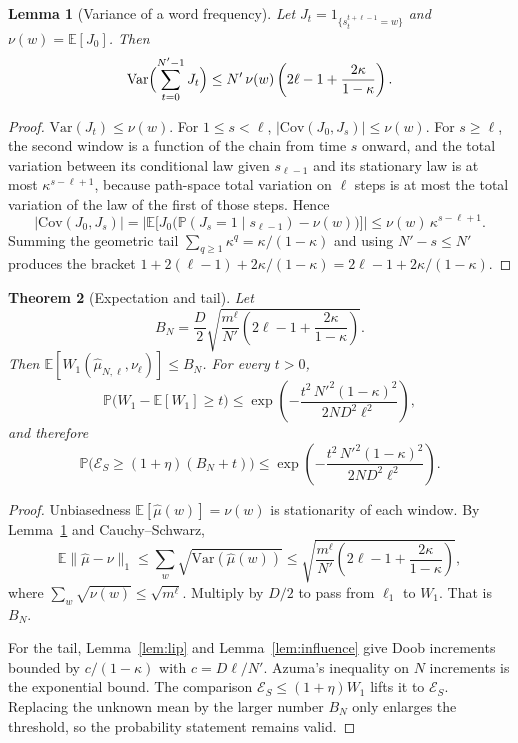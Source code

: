 \documentclass[11pt,reqno]{amsart}
\newtheorem{theorem}{Theorem}[section]
\newtheorem{lemma}[theorem]{Lemma}
\theoremstyle{remark}
\newcommand{\ES}{\mathcal{E}_S}
\newcommand{\Var}{\mathrm{Var}}
\newcommand{\Cov}{\mathrm{Cov}}
\begin{document}
\begin{lemma}[Variance of a word frequency]\label{lem:var}
Let $J_t = 1_{\{s_t^{t+\ell-1} = w\}}$ and $\nu(w) = \mathbb{E}[J_0]$. Then
\[
\Var\Bigl(\sum_{t=0}^{N'-1} J_t\Bigr)
\le
N' \,\nu(w) \left(2\ell - 1 + \frac{2\kappa}{1-\kappa}\right).
\]
\end{lemma}
\begin{proof}
$\Var(J_t) \le \nu(w)$. For $1 \le s < \ell$, $|\Cov(J_0,J_s)| \le \nu(w)$. For $s \ge \ell$, the second window is a function of the chain from time $s$ onward, and the total variation between its conditional law given $s_{\ell-1}$ and its stationary law is at most $\kappa^{s-\ell+1}$, because path-space total variation on $\ell$ steps is at most the total variation of the law of the first of those steps. Hence
\[
|\Cov(J_0, J_s)|
=
\bigl|\mathbb{E}\bigl[J_0\bigl(\mathbb{P}(J_s=1 \mid s_{\ell-1}) - \nu(w)\bigr)\bigr]\bigr|
\le
\nu(w)\, \kappa^{s-\ell+1}.
\]
Summing the geometric tail $\sum_{q \ge 1} \kappa^q = \kappa/(1-\kappa)$ and using $N'-s \le N'$ produces the bracket $1 + 2(\ell-1) + 2\kappa/(1-\kappa) = 2\ell-1 + 2\kappa/(1-\kappa)$.
\end{proof}

\begin{theorem}[Expectation and tail]\label{thm:tail}
Let
\[
B_N = \frac{D}{2}\sqrt{\frac{m^\ell}{N'}\left(2\ell - 1 + \frac{2\kappa}{1-\kappa}\right)}.
\]
Then $\mathbb{E}[W_1(\hat\mu_{N,\ell}, \nu_\ell)] \le B_N$. For every $t > 0$,
\[
\mathbb{P}\bigl(W_1 - \mathbb{E}[W_1] \ge t\bigr)
\le
\exp\left(
-\frac{t^2 \, N'^2 (1-\kappa)^2}{2 N D^2 \ell^2}
\right),
\]
and therefore
\[
\mathbb{P}\bigl(\ES \ge (1+\eta)(B_N + t)\bigr)
\le
\exp\left(
-\frac{t^2 \, N'^2 (1-\kappa)^2}{2 N D^2 \ell^2}
\right).
\]
\end{theorem}
\begin{proof}
Unbiasedness $\mathbb{E}[\hat\mu(w)] = \nu(w)$ is stationarity of each window. By Lemma~\ref{lem:var} and Cauchy--Schwarz,
\[
\mathbb{E}\|\hat\mu-\nu\|_1
\le
\sum_w \sqrt{\Var(\hat\mu(w))}
\le
\sqrt{\frac{m^\ell}{N'}\left(2\ell-1+\frac{2\kappa}{1-\kappa}\right)},
\]
where $\sum_w \sqrt{\nu(w)} \le \sqrt{m^\ell}$. Multiply by $D/2$ to pass from $\ell_1$ to $W_1$. That is $B_N$.

For the tail, Lemma~\ref{lem:lip} and Lemma~\ref{lem:influence} give Doob increments bounded by $c/(1-\kappa)$ with $c = D\ell/N'$. Azuma's inequality on $N$ increments is the exponential bound. The comparison $\ES \le (1+\eta) W_1$ lifts it to $\ES$. Replacing the unknown mean by the larger number $B_N$ only enlarges the threshold, so the probability statement remains valid.
\end{proof}
\end{document}
